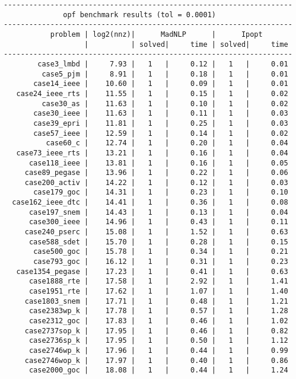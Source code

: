 \begin{lstlisting}
--------------------------------------------------------------------
              opf benchmark results (tol = 0.0001)
--------------------------------------------------------------------
           problem | log2(nnz)|      MadNLP      |      Ipopt        
                   |          | solved|     time | solved|     time     
--------------------------------------------------------------------
        case3_lmbd |     7.93 |   1   |     0.12 |   1   |     0.01
         case5_pjm |     8.91 |   1   |     0.18 |   1   |     0.01
       case14_ieee |    10.60 |   1   |     0.09 |   1   |     0.01
   case24_ieee_rts |    11.55 |   1   |     0.15 |   1   |     0.02
         case30_as |    11.63 |   1   |     0.10 |   1   |     0.02
       case30_ieee |    11.63 |   1   |     0.11 |   1   |     0.03
       case39_epri |    11.81 |   1   |     0.25 |   1   |     0.03
       case57_ieee |    12.59 |   1   |     0.14 |   1   |     0.02
          case60_c |    12.74 |   1   |     0.20 |   1   |     0.04
   case73_ieee_rts |    13.21 |   1   |     0.16 |   1   |     0.04
      case118_ieee |    13.81 |   1   |     0.16 |   1   |     0.05
     case89_pegase |    13.96 |   1   |     0.22 |   1   |     0.06
     case200_activ |    14.22 |   1   |     0.12 |   1   |     0.03
       case179_goc |    14.31 |   1   |     0.23 |   1   |     0.10
  case162_ieee_dtc |    14.41 |   1   |     0.36 |   1   |     0.08
      case197_snem |    14.43 |   1   |     0.13 |   1   |     0.04
      case300_ieee |    14.96 |   1   |     0.43 |   1   |     0.11
     case240_pserc |    15.08 |   1   |     1.52 |   1   |     0.63
      case588_sdet |    15.70 |   1   |     0.28 |   1   |     0.15
       case500_goc |    15.78 |   1   |     0.34 |   1   |     0.21
       case793_goc |    16.12 |   1   |     0.31 |   1   |     0.23
   case1354_pegase |    17.23 |   1   |     0.41 |   1   |     0.63
      case1888_rte |    17.58 |   1   |     2.92 |   1   |     1.41
      case1951_rte |    17.62 |   1   |     1.07 |   1   |     1.40
     case1803_snem |    17.71 |   1   |     0.48 |   1   |     1.21
      case2383wp_k |    17.78 |   1   |     0.57 |   1   |     1.28
      case2312_goc |    17.83 |   1   |     0.46 |   1   |     1.02
     case2737sop_k |    17.95 |   1   |     0.46 |   1   |     0.82
      case2736sp_k |    17.95 |   1   |     0.50 |   1   |     1.12
      case2746wp_k |    17.96 |   1   |     0.44 |   1   |     0.99
     case2746wop_k |    17.97 |   1   |     0.40 |   1   |     0.86
      case2000_goc |    18.08 |   1   |     0.44 |   1   |     1.24

\end{lstlisting}
